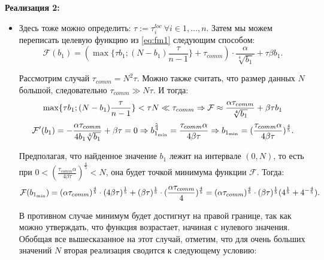 \documentclass{article}
\theoremstyle{definition}
\theoremstyle{plain}
\begin{document}
\textbf{Реализация 2:}
\begin{itemize}
\item []
Здесь тоже можно определить: $\tau := \tau_i^{loc}~ \forall i \in {1,\ldots, n} $. Затем мы можем переписать целевую функцию из \eqref{eq:fm1} следующим способом:
\begin{equation*}
        \mathcal{F}(b_1) = (\max\{\tau b_1; (N-b_1) \frac{\tau}{n-1}\} + \tau_{comm}) \cdot \frac{\alpha}{\sqrt[4]{b_1}}+\tau \beta b_1. 
\end{equation*}

Рассмотрим случай $\tau_{comm} = N^2 \tau$. Можно также считать, что размер данных $N$ большой, следовательно $\tau_{comm} \gg N\tau$. И тогда:
\begin{equation}
    \notag
     \max \{\tau b_1; (N-b_1)\frac{\tau}{n-1}\} < \tau N \ll \tau_{comm}\Rightarrow \mathcal{F} \approx \frac{\alpha \tau_{comm}}{\sqrt[4]{b_1}} + \beta \tau b_1 
\end{equation}
\begin{equation}
    \notag
    \mathcal{F}' (b_1) = -\frac{\alpha \tau_{comm}}{4b_1\sqrt[4]{b_1}} + \beta \tau = 0 \Rightarrow b_{1_{\min}}^\frac{5}{4} = \frac{\tau _{comm}\alpha}{4\beta\tau}\Rightarrow b_{1_{\min}} = (\frac{\tau _{comm}\alpha}{4\beta\tau})^{\frac{4}{5}}.
\end{equation}

Предполагая, что найденное значение $b_1$ лежит на интервале $(0, N) $, то есть при $0 < (\frac{\tau _{comm}\alpha}{4\beta\tau})^{\frac{4}{5}} < N$, она будет точкой минимума функции $\mathcal{F}$. Тогда:
\begin{equation}
    \notag
    \mathcal{F}(b_{1_{\min}}) = (\alpha \tau_{comm})^\frac{4}{5} \cdot (4\beta\tau)^\frac{1}{5} + (\beta \tau)^\frac{1}{5}\cdot(\frac{\alpha \tau_{comm}}{4})^\frac{4}{5} = (\alpha \tau_{comm})^\frac{4}{5}\cdot (\beta\tau)^\frac{1}{5}(4^\frac{1}{5} + 4^{-\frac{4}{5}}).
\end{equation}
    
В противном случае минимум будет достигнут на правой границе, так как можно утверждать, что функция возрастает, начиная с нулевого значения. Обобщая все вышесказанное на этот случай, отметим, что для очень больших значений $N$ вторая реализация сводится к следующему условию:


\end{itemize}
\end{document}
